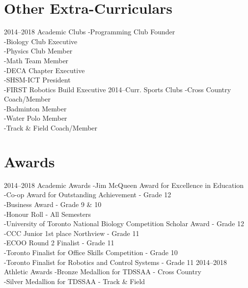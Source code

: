 \documentclass[]{chandan-cv}
\begin{document}
\newpage

\section{Other Extra-Curriculars}

\begin{entrylist}
  \entry
    {2014–2018}
    {Academic Clubs}
    {}
    { -Programming Club Founder
    \\-Biology Club Executive
    \\-Physics Club Member
    \\-Math Team Member
    \\-DECA Chapter Executive
    \\-SHSM-ICT President
    \\-FIRST Robotics Build Executive}
  \entry
    {2014–Curr.}
    {Sports Clubs}
    {}
    { -Cross Country Coach/Member
    \\-Badminton Member
    \\-Water Polo Member
    \\-Track \& Field Coach/Member}
\end{entrylist}

\section{Awards}

\begin{entrylist}
  \entry
    {2014–2018}
    {Academic Awards}
    {}
    { -Jim McQueen Award for Excellence in Education
    \\-Co-op Award for Outstanding Achievement - Grade 12
    \\-Business Award - Grade 9 \& 10
    \\-Honour Roll - All Semesters
    \\-University of Toronto National Biology Competition Scholar Award - Grade 12
    \\-CCC Junior 1st place Northview - Grade 11
    \\-ECOO Round 2 Finalist - Grade 11
    \\-Toronto Finalist for Office Skills Competition - Grade 10
    \\-Toronto Finalist for Robotics and Control Systems - Grade 11}
  \entry
    {2014–2018}
    {Athletic Awards}
    {}
    { -Bronze Medallion for TDSSAA - Cross Country
    \\-Silver Medallion for TDSSAA - Track \& Field}
\end{entrylist}
\end{document}
